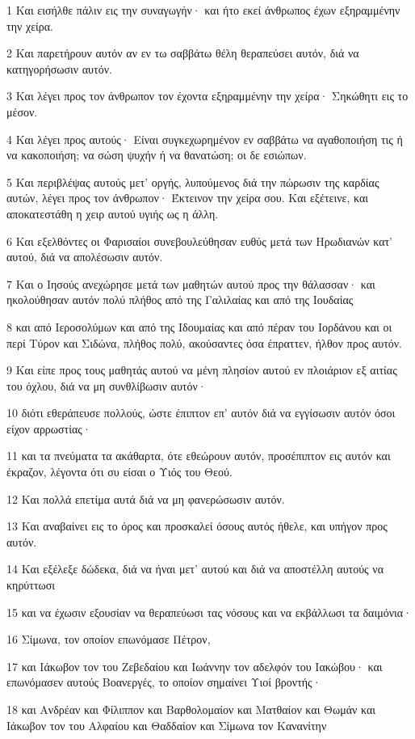 \par 1 Και εισήλθε πάλιν εις την συναγωγήν· και ήτο εκεί άνθρωπος έχων εξηραμμένην την χείρα.
\par 2 Και παρετήρουν αυτόν αν εν τω σαββάτω θέλη θεραπεύσει αυτόν, διά να κατηγορήσωσιν αυτόν.
\par 3 Και λέγει προς τον άνθρωπον τον έχοντα εξηραμμένην την χείρα· Σηκώθητι εις το μέσον.
\par 4 Και λέγει προς αυτούς· Είναι συγκεχωρημένον εν σαββάτω να αγαθοποιήση τις ή να κακοποιήση; να σώση ψυχήν ή να θανατώση; οι δε εσιώπων.
\par 5 Και περιβλέψας αυτούς μετ' οργής, λυπούμενος διά την πώρωσιν της καρδίας αυτών, λέγει προς τον άνθρωπον· Έκτεινον την χείρα σου. Και εξέτεινε, και αποκατεστάθη η χειρ αυτού υγιής ως η άλλη.
\par 6 Και εξελθόντες οι Φαρισαίοι συνεβουλεύθησαν ευθύς μετά των Ηρωδιανών κατ' αυτού, διά να απολέσωσιν αυτόν.
\par 7 Και ο Ιησούς ανεχώρησε μετά των μαθητών αυτού προς την θάλασσαν· και ηκολούθησαν αυτόν πολύ πλήθος από της Γαλιλαίας και από της Ιουδαίας
\par 8 και από Ιεροσολύμων και από της Ιδουμαίας και από πέραν του Ιορδάνου και οι περί Τύρον και Σιδώνα, πλήθος πολύ, ακούσαντες όσα έπραττεν, ήλθον προς αυτόν.
\par 9 Και είπε προς τους μαθητάς αυτού να μένη πλησίον αυτού εν πλοιάριον εξ αιτίας του όχλου, διά να μη συνθλίβωσιν αυτόν·
\par 10 διότι εθεράπευσε πολλούς, ώστε έπιπτον επ' αυτόν διά να εγγίσωσιν αυτόν όσοι είχον αρρωστίας·
\par 11 και τα πνεύματα τα ακάθαρτα, ότε εθεώρουν αυτόν, προσέπιπτον εις αυτόν και έκραζον, λέγοντα ότι συ είσαι ο Υιός του Θεού.
\par 12 Και πολλά επετίμα αυτά διά να μη φανερώσωσιν αυτόν.
\par 13 Και αναβαίνει εις το όρος και προσκαλεί όσους αυτός ήθελε, και υπήγον προς αυτόν.
\par 14 Και εξέλεξε δώδεκα, διά να ήναι μετ' αυτού και διά να αποστέλλη αυτούς να κηρύττωσι
\par 15 και να έχωσιν εξουσίαν να θεραπεύωσι τας νόσους και να εκβάλλωσι τα δαιμόνια·
\par 16 Σίμωνα, τον οποίον επωνόμασε Πέτρον,
\par 17 και Ιάκωβον τον του Ζεβεδαίου και Ιωάννην τον αδελφόν του Ιακώβου· και επωνόμασεν αυτούς Βοανεργές, το οποίον σημαίνει Υιοί βροντής·
\par 18 και Ανδρέαν και Φίλιππον και Βαρθολομαίον και Ματθαίον και Θωμάν και Ιάκωβον τον του Αλφαίου και Θαδδαίον και Σίμωνα τον Κανανίτην
